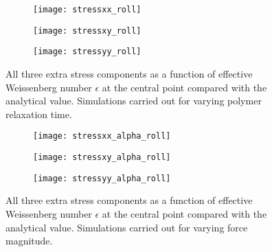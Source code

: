 \begin{figure}[htbp]
	\centering
	\begin{subfigure}{0.5\linewidth}
	\texttt{[image: stressxx\_roll]}
	\label{fig:stressxx_roll}
\end{subfigure}\medskip
\begin{subfigure}{0.5\linewidth}
	\texttt{[image: stressxy\_roll]}
	\label{fig:stressxy_roll}
\end{subfigure}\hfill
\begin{subfigure}{0.5\linewidth}
	\texttt{[image: stressyy\_roll]}
	\label{fig:stressyy_roll}
\end{subfigure}
\caption{All three extra stress components as a function of effective Weissenberg number $\epsilon$ at the central point compared with the analytical value. Simulations carried out for varying polymer relaxation time.}
\label{fig:centerpoint_stress}
\end{figure}

\begin{figure}[htbp]
	\centering
	\begin{subfigure}{0.5\linewidth}
	\texttt{[image: stressxx\_alpha\_roll]}
	\label{fig:stressxx_alpha_roll}
\end{subfigure}\medskip
\begin{subfigure}{0.5\linewidth}
	\texttt{[image: stressxy\_alpha\_roll]}
	\label{fig:stressxy_alpha_roll}
\end{subfigure}\hfill
\begin{subfigure}{0.5\linewidth}
	\texttt{[image: stressyy\_alpha\_roll]}
	\label{fig:stressyy_alpha_roll}
\end{subfigure}
\caption{All three extra stress components as a function of effective Weissenberg number $\epsilon$ at the central point compared with the analytical value. Simulations carried out for varying force magnitude.}
\label{fig:centerpoint_stress_alpha}
\end{figure}

